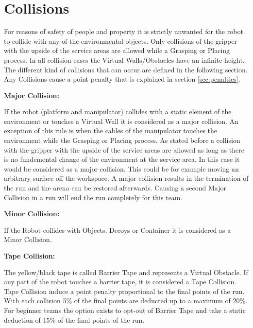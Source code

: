 \section{Collisions}\label{sec:Collisions}

For reasons of safety of people and property it is strictly unwanted for the robot to collide
with any of the environmental objects. Only collisions of the gripper with the upside of
the service areas are allowed while a Grasping or Placing process. In all collision cases the Virtual Walls/Obstacles have an infinite height. The different kind of collisions that can occur are defined in the
following section. Any Collisions cause a point penalty that is explained in section \ref{sec:penalties}.  

\textbf{Major Collision:}

If the robot (platform and manipulator) collides with a static element of the environment or touches a Virtual Wall it is considered as a major collision. An exception of this rule is when the cables of the manipulator touches the environment while the Grasping or Placing process. As stated before a collision with the  gripper with the upside of the service areas are allowed as long as there is no fundemental change of the environment at the service area. In this case it would be considered as a major collision. This could be for example moving an arbitrary surface off the workspace. A major collision results in the termination of the run and the arena can be restored afterwards. Causing a second Major Collision in a run will end the run completely for this team.


\textbf{Minor Collision:}

If the Robot collides with Objects, Decoys or Container it is considered as a Minor Collision. 


\textbf{Tape Collision:}

The yellow/black tape is called Barrier Tape and represents a Virtual Obstacle. If any part of the robot
touches a barrier tape, it is considered a Tape Collision. Tape Collision induce a point penalty
proportional to the final points of the run. With each collision 5\% of the final points are deducted up to a maximum
of 20\%. For beginner teams the option exists to opt-out of Barrier Tape and take a static deduction of 15\% of the
final points of the run.

